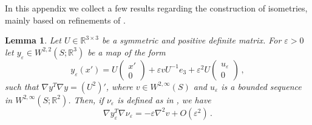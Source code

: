 \documentclass{article}
\theoremstyle{plain}
\theoremstyle{plain}
\theoremstyle{plain}
\newtheorem{lemma}[teo]{Lemma}
\theoremstyle{plain}
\theoremstyle{plain}
\theoremstyle{definition}
\theoremstyle{definition}
\renewcommand{\r}{\mathbb{R}}
\begin{document}
In this appendix we collect a few results regarding the construction of isometries, mainly based on refinements of \cite[Section 8]{FRIESECKE2006}.

\begin{lemma} \label{lemma:convergence_foundamental_form}
    Let $U \in \r^{3 \times 3}$ be a symmetric and positive definite matrix. For $\varepsilon > 0$ let $y_\varepsilon \in W^{2,2}(S; \r^3)$ be a map of the form
    \[
        y_\varepsilon(x') = U \begin{pmatrix}
            x' \\ 0
        \end{pmatrix} + \varepsilon vU^{-1}e_3 + \varepsilon^2 U\begin{pmatrix}
            u_\varepsilon\\
            0
        \end{pmatrix} \,,
    \]
    such that $\nabla y^T \nabla y = (U^2)'$, where $v \in W^{2,\infty}(S)$ and $u_\varepsilon$ is a bounded sequence in $ W^{2, \infty}(S;\r^2) $. Then, if $\nu_\varepsilon$ is defined as in , we have
    \[
        \nabla y_\varepsilon^T \nabla \nu_\varepsilon = - \varepsilon \nabla^2 v + O(\varepsilon^2) \,.
    \]
\end{lemma}
\end{document}
